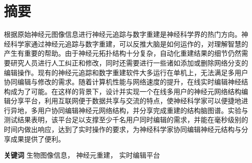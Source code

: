 \chapter{摘要}

根据原始神经元图像信息进行神经元追踪与数字重建是神经科学界的热门方向。神经科学家通过神经元追踪与数字重建，可以反推大脑是如何运作的，对理解智慧的产生有重要的帮助。由于神经元拓扑结构十分复杂，自动化重建结果的细节仍然需要研究人员进行人工纠正和修改，同时还需要进行一些诸如添加或删除网络分支的编辑操作。现有的神经元追踪和数字重建软件大多运行在单机上，无法满足多用户协同编辑与修改的需求。随着计算机性能与网络速度的提升，在线实时编辑神经结构成为了可能。在这样的背景下，设计并实现一个在线多用户的神经元网络结构编辑分享平台，利用互联网便于数据共享与交流的特点，使神经科学家可以便捷地进行异地，多用户协同编辑神经元网络结构，并分享完成重建的结构脑图谱。实验与测试结果表明，该平台足以支撑至少千名用户同时编辑的需求，并能在毫秒级别的时间内做出响应，达到了实时操作的要求，为神经科学家协同编辑神经元结构与分享成果提供了便利。

{
    \vspace{1em}
    \setlength{\parindent}{0em}
    \textbf{关键词} \; 生物图像信息， \; 神经元重建， \; 实时编辑平台 \par
}
